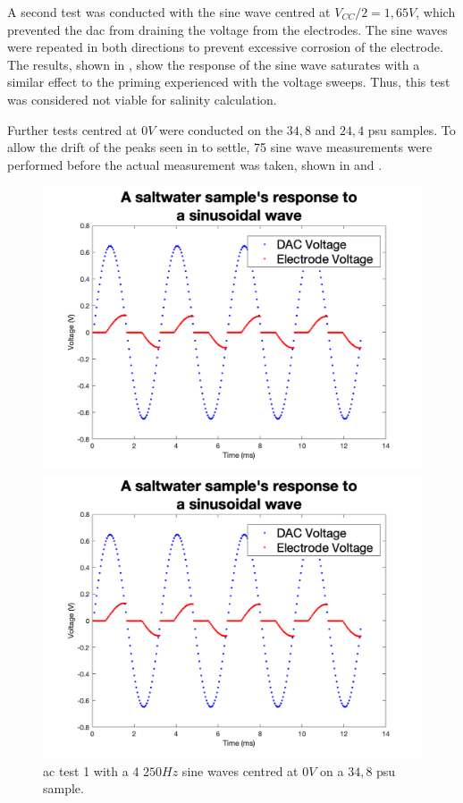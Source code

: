 A second test was conducted with the sine wave centred at $V_{CC}/2 = 1,65V$, which prevented the \gls{dac} from draining the voltage from the electrodes.
The sine waves were repeated in both directions to prevent excessive corrosion of the electrode.
The results, shown in , show the response of the sine wave saturates with a similar effect to the priming experienced with the voltage sweeps.
Thus, this test was considered not viable for salinity calculation.

Further tests centred at $0V$ were conducted on the $34,8$ and $24,4$ \gls{psu} samples.
To allow the drift of the peaks seen in  to settle, 75 sine wave measurements were performed before the actual measurement was taken, shown in  and .

\begin{figure}[ht]
    \begin{minipage}{0.5\textwidth}
        \centering
        \includegraphics[width=\textwidth]{Figures/Testing/TiAC3}
        \caption{\gls{ac} test 1 with a 4 $250Hz$ sine waves centred at $0V$ on a $34,8$ \gls{psu} sample.}
        \label{fig:test19} %
    \end{minipage}
    \begin{minipage}{0.5\textwidth}
        \centering
        \includegraphics[width=\textwidth]{Figures/Testing/TiAC4}

\end{minipage}
\end{figure}
